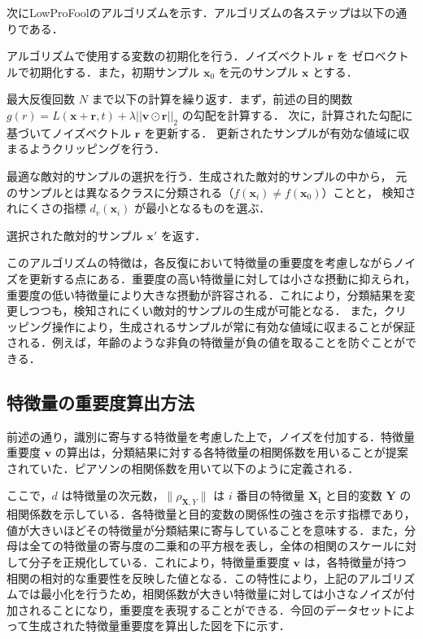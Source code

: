 次にLowProFoolのアルゴリズムを示す．アルゴリズムの各ステップは以下の通りである．
\begin{algorithm_step}
    \item[Step 1)] アルゴリズムで使用する変数の初期化を行う．ノイズベクトル $\bm{r}$ を
        ゼロベクトルで初期化する．また，初期サンプル $\bm{x}_0$ を元のサンプル $\bm{x}$ とする．
    
    \item[Step 2)] 最大反復回数 $N$ まで以下の計算を繰り返す．まず，前述の目的関数 
        $g(r) = L(\bm{x}+\bm{r}, t) + \lambda ||\bm{v} \odot \bm{r}||_2$ の勾配を計算する．
        次に，計算された勾配に基づいてノイズベクトル $\bm{r}$ を更新する．
        更新されたサンプルが有効な値域に収まるようクリッピングを行う．
    
    \item[Step 3)] 最適な敵対的サンプルの選択を行う．生成された敵対的サンプルの中から，
        元のサンプルとは異なるクラスに分類される（$f(\bm{x}_i) \neq f(\bm{x}_0)$）ことと，
        検知されにくさの指標 $d_v(\bm{x}_i)$ が最小となるものを選ぶ．
    
    \item[Step 4)] 選択された敵対的サンプル $\bm{x}'$ を返す．
    \end{algorithm_step}


このアルゴリズムの特徴は，各反復において特徴量の重要度を考慮しながらノイズを更新する点にある．重要度の高い特徴量に対しては小さな摂動に抑えられ，重要度の低い特徴量により大きな摂動が許容される．これにより，分類結果を変更しつつも，検知されにくい敵対的サンプルの生成が可能となる．
また，クリッピング操作により，生成されるサンプルが常に有効な値域に収まることが保証される．例えば，年齢のような非負の特徴量が負の値を取ることを防ぐことができる．


\subsection{特徴量の重要度算出方法}

前述の通り，識別に寄与する特徴量を考慮した上で，ノイズを付加する．特徴量重要度 $\bm{v}$ の算出は，分類結果に対する各特徴量の相関係数を用いることが提案されていた．ピアソンの相関係数を用いて以下のように定義される．

ここで，$d$ は特徴量の次元数，$\|\rho_{\bm{X},Y}\|$ は $i$ 番目の特徴量 $\bm{X_i}$ と目的変数 $\bm{Y}$ の相関係数を示している．各特徴量と目的変数の関係性の強さを示す指標であり，値が大きいほどその特徴量が分類結果に寄与していることを意味する．また，分母は全ての特徴量の寄与度の二乗和の平方根を表し，全体の相関のスケールに対して分子を正規化している．これにより，特徴量重要度 $\bm{v}$ は，各特徴量が持つ相関の相対的な重要性を反映した値となる．この特性により，上記のアルゴリズムでは最小化を行うため，相関係数が大きい特徴量に対しては小さなノイズが付加されることになり，重要度を表現することができる．今回のデータセットによって生成された特徴量重要度を算出した図を下に示す．

